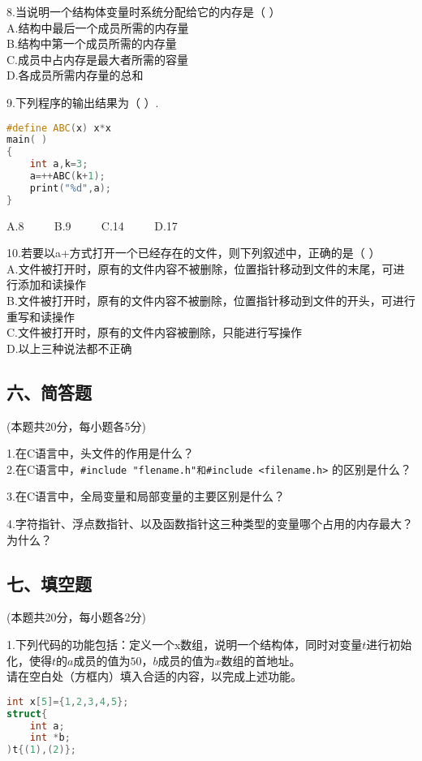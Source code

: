 8.当说明一个结构体变量时系统分配给它的内存是（    ）  \\
A.结构中最后一个成员所需的内存量 \\
B.结构中第一个成员所需的内存量 \\
C.成员中占内存是最大者所需的容量 \\
D.各成员所需内存量的总和

9.下列程序的输出结果为（    ）. \\
\begin{lstlisting}[language=cpp]
#define ABC(x) x*x
main( )
{
    int a,k=3;
    a=++ABC(k+1);
    print("%d",a);
}
\end{lstlisting}
A.8 $\qquad$ B.9 $\qquad$ C.14 $\qquad$ D.17

10.若要以a+方式打开一个已经存在的文件，则下列叙述中，正确的是（    ） \\
A.文件被打开时，原有的文件内容不被删除，位置指针移动到文件的末尾，可进行添加和读操作 \\
B.文件被打开时，原有的文件内容不被删除，位置指针移动到文件的开头，可进行重写和读操作 \\
C.文件被打开时，原有的文件内容被删除，只能进行写操作 \\
D.以上三种说法都不正确

\subsection{六、简答题}
(本题共20分，每小题各5分)

1.在C语言中，头文件的作用是什么？ \\
2.在C语言中，\verb|#include "flename.h"和#include <filename.h>| 的区别是什么？

3.在C语言中，全局变量和局部变量的主要区别是什么？

4.字符指针、浮点数指针、以及函数指针这三种类型的变量哪个占用的内存最大？为什么？

\subsection{七、填空题}
(本题共20分，每小题各2分)

1.下列代码的功能包括：定义一个x数组，说明一个结构体，同时对变量$t$进行初始化，使得$t$的$a$成员的值为$50$，$b$成员的值为$x$数组的首地址。 \\
请在空白处（方框内）填入合适的内容，以完成上述功能。
\begin{lstlisting}[language=cpp]
int x[5]={1,2,3,4,5};
struct{
    int a;
    int *b;
)t{(1),(2)};
\end{lstlisting}

